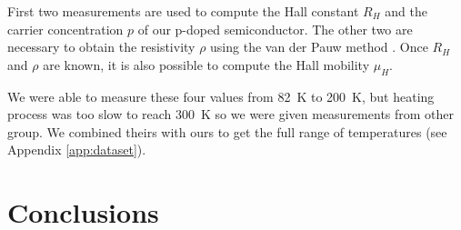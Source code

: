\documentclass[11pt,a4paper]{article}
\begin{document}
First two measurements are used to compute the Hall constant $R_H$ and the carrier concentration $p$ of our p-doped semiconductor. The other two are necessary to obtain the resistivity $\rho$ using the van der Pauw method \cite{vdP}. Once $R_H$ and $\rho$ are known, it is also possible to compute the Hall mobility $\mu_H$.

We were able to measure these four values from \SI{82}{\kelvin} to \SI{200}{\kelvin}, but heating process was too slow to reach \SI{300}{\kelvin} so we were given measurements from other group. We combined theirs with ours to get the full range of temperatures (see Appendix \ref{app:dataset}).

\section{Conclusions}

\nocite{*}
\vfill


\end{document}
